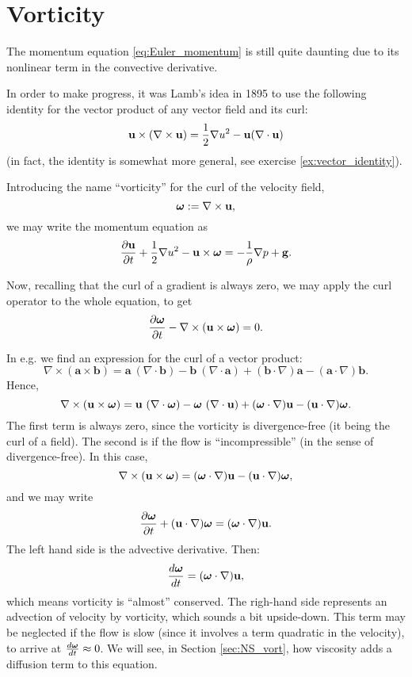 \section{Vorticity}
\label{sec:Euler_vorticity}

The momentum equation \ref{eq:Euler_momentum} is still quite daunting
due to its nonlinear term in the convective derivative.

In order to make progress, it was Lamb's idea in 1895 to use the
following identity for the vector product of any vector field and its
curl:
\begin{equation}
  \label{eq:Lambs_identity}
  \mathbf{u} \times ( \nabla\times \mathbf{u}) =
  \frac12 \nabla u^2 - \mathbf{u} (\nabla\cdot\mathbf{u} )
\end{equation}
(in fact, the identity is somewhat more general, see exercise
\ref{ex:vector_identity}).

Introducing the name ``vorticity'' for the curl of the velocity field,
\[
\bm{\omega} := \nabla\times\mathbf{u} ,
\]
we may write the momentum equation as
\begin{equation}
  \label{eq:Euler_momentum_w_vort}
  \frac{\partial \mathbf{u} }{\partial t} +
  \frac12 \nabla u^2 - \mathbf{u} \times\bm{\omega} =
  - \frac{1}{\rho} \nabla p 
  + \mathbf{g} .
\end{equation}

Now, recalling that the curl of a gradient is always zero,
we may apply the curl operator to the whole equation, to get
\[
\frac{\partial \bm{\omega} }{\partial t} -
\nabla\times(\mathbf{u}\times\bm{\omega}) = 0 .
\]

In e.g. \cite{wiki:Vector_calculus_identities} we find an expression
for the curl of a vector product:
\[
  \nabla \times (\mathbf {a} \times \mathbf {b} ) =
  \mathbf {a} \ (\nabla \cdot \mathbf {b} )
  -\mathbf {b} \ (\nabla \cdot \mathbf {a} )
  +(\mathbf {b} \cdot \nabla )\mathbf {a}
  -(\mathbf {a} \cdot \nabla )\mathbf {b} .
\]
Hence,
\[
  \nabla \times (\mathbf{u} \times \bm{\omega} ) =
  \mathbf{u} \ (\nabla \cdot \bm{\omega} )
  -\bm{\omega} \ (\nabla \cdot \mathbf{u} )
  +(\bm{\omega} \cdot \nabla )\mathbf{u}
  -(\mathbf{u} \cdot \nabla )\bm{\omega}.
\]
The first term is always zero, since the vorticity is divergence-free
(it being the curl of a field). The second is if the flow is
``incompressible'' (in the sense of divergence-free). In this case,
\begin{equation}
  \label{eq:conv_accel_as_vort}
  \nabla \times (\mathbf{u} \times \bm{\omega} ) =
  (\bm{\omega} \cdot \nabla )\mathbf{u}
  -(\mathbf{u} \cdot \nabla )\bm{\omega},
\end{equation}
and we may write
\[
  \frac{\partial \bm{\omega} }{\partial t}
  + ( \mathbf{u} \cdot \nabla )\bm{\omega} =  (\bm{\omega} \cdot \nabla )\mathbf{u} .
\]
The left hand side is the advective derivative. Then:
\[
  \frac{d \bm{\omega} }{d t}  =  (\bm{\omega} \cdot \nabla )\mathbf{u} ,
\]
which means vorticity is ``almost'' conserved. The righ-hand side
represents an advection of velocity by vorticity, which sounds a bit
upside-down. This term may be neglected if the flow is slow (since it
involves a term quadratic in the velocity), to arrive at
$\frac{d \bm{\omega} }{d t}\approx 0$. We will see, in Section
\ref{sec:NS_vort}, how viscosity adds a diffusion term to this
equation.


